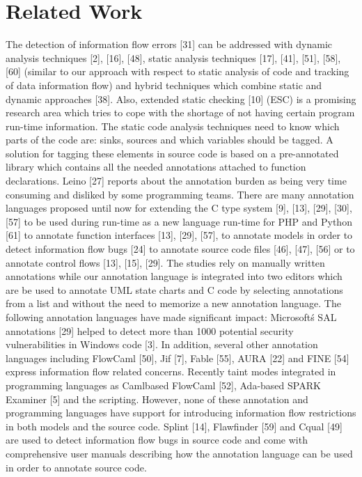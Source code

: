 \chapter{Related Work}
The detection of information flow errors [31] can be
addressed with dynamic analysis techniques [2], [16], [48],
static analysis techniques [17], [41], [51], [58], [60] (similar
to our approach with respect to static analysis of code and
tracking of data information flow) and hybrid techniques which
combine static and dynamic approaches [38]. Also, extended
static checking [10] (ESC) is a promising research area which
tries to cope with the shortage of not having certain program
run-time information.
The static code analysis techniques need to know which
parts of the code are: sinks, sources and which variables
should be tagged. A solution for tagging these elements in
source code is based on a pre-annotated library which contains
all the needed annotations attached to function declarations.
Leino [27] reports about the annotation burden as being very
time consuming and disliked by some programming teams.
There are many annotation languages proposed until now for
extending the C type system [9], [13], [29], [30], [57] to be
used during run-time as a new language run-time for PHP and
Python [61] to annotate function interfaces [13], [29], [57], to
annotate models in order to detect information flow bugs [24]
to annotate source code files [46], [47], [56] or to annotate
control flows [13], [15], [29]. The studies rely on manually
written annotations while our annotation language is integrated
into two editors which are be used to annotate UML state
charts and C code by selecting annotations from a list and
without the need to memorize a new annotation language.
The following annotation languages have made significant
impact: Microsoft\'s SAL annotations [29] helped to detect
more than 1000 potential security vulnerabilities in Windows
code [3]. In addition, several other annotation languages including FlowCaml [50], Jif [7], Fable [55], AURA [22] and
FINE [54] express information flow related concerns. Recently
taint modes integrated in programming languages as Camlbased FlowCaml [52], Ada-based SPARK Examiner [5] and the scripting. However, none of these annotation and programming languages have support for introducing information flow
restrictions in both models and the source code.
Splint [14], Flawfinder [59] and Cqual [49] are used to
detect information flow bugs in source code and come with
comprehensive user manuals describing how the annotation
language can be used in order to annotate source code.
